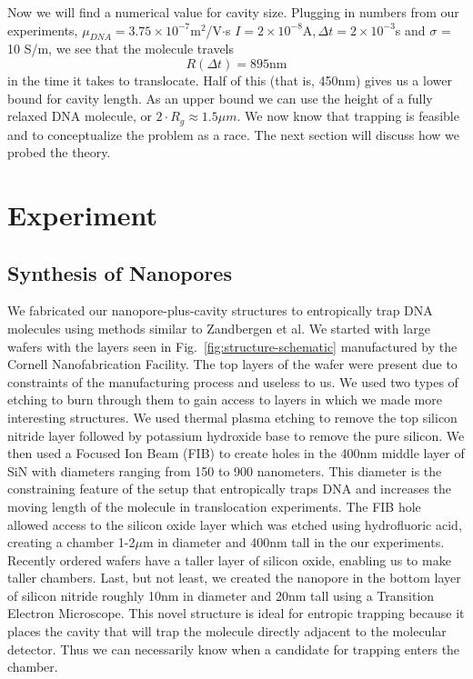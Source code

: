 \documentclass[aps,prl,preprint,groupedaddress]{revtex4}
\begin{document}
Now we will find a numerical value for cavity size.
Plugging in numbers from our experiments, \(\mu_{DNA} = 3.75 \times 10^{-7}\)m$^2$/V$\cdot$s \cite{mobility} \(I = 2\times 10^{-8}\mathrm{A}, \Delta t = 2 \times 10^{-3}\)s and \(\sigma\) = 10 S/m\cite{CRC}, we see that the molecule travels \[R(\Delta t) = 895 \mathrm{nm} \] in the time it takes to translocate.
Half of this (that is, 450nm) gives us a lower bound for cavity length.
As an upper bound we can use the height of a fully relaxed DNA molecule, or $2\cdot R_g \approx 1.5 \mu m$.
We now know that trapping is feasible and to conceptualize the problem as a race.
The next section will discuss how we probed the theory.

\section{Experiment}

\subsection{Synthesis of Nanopores}

We fabricated our nanopore-plus-cavity structures to entropically trap DNA molecules using methods similar to Zandbergen et al.\cite{nanopore-fabrication}
We started with large wafers with the layers seen in Fig.~\ref{fig:structure-schematic} manufactured by the Cornell Nanofabrication Facility.
The top layers of the wafer were present due to constraints of the manufacturing process and useless to us.
We used two types of etching to burn through them to gain access to layers in which we made more interesting structures.
We used thermal plasma etching to remove the top silicon nitride layer followed by potassium hydroxide base to remove the pure silicon.
We then used a Focused Ion Beam (FIB) to create holes in the 400nm middle layer of SiN with diameters ranging from 150 to 900 nanometers.
This diameter is the constraining feature of the setup that entropically traps DNA and increases the moving length of the molecule in translocation experiments.
The FIB hole allowed access to the silicon oxide layer which was etched using hydrofluoric acid, creating a chamber 1-2\(\mu\)m in diameter and 400nm tall in the our experiments.
Recently ordered wafers have a taller layer of silicon oxide, enabling us to make taller chambers.
Last, but not least, we created the nanopore in the bottom layer of silicon nitride roughly 10nm in diameter and 20nm tall using a Transition Electron Microscope.
This novel structure is ideal for entropic trapping because it places the cavity that will trap the molecule directly adjacent to the molecular detector.
Thus we can necessarily know when a candidate for trapping enters the chamber.
\end{document}
